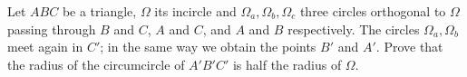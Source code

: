 Let $ABC$ be a triangle, $\Omega$ its incircle and $\Omega_a, \Omega_b, \Omega_c$ three circles orthogonal to $\Omega$ passing through $B$ and $C$, $A$ and $C$, and $A$ and $B$ respectively. The circles $\Omega_a, \Omega_b$ meet again in $C'$; in the same way we obtain the points $B'$ and $A'$. Prove that the radius of the circumcircle of $A'B'C'$ is half the radius of $\Omega$.
